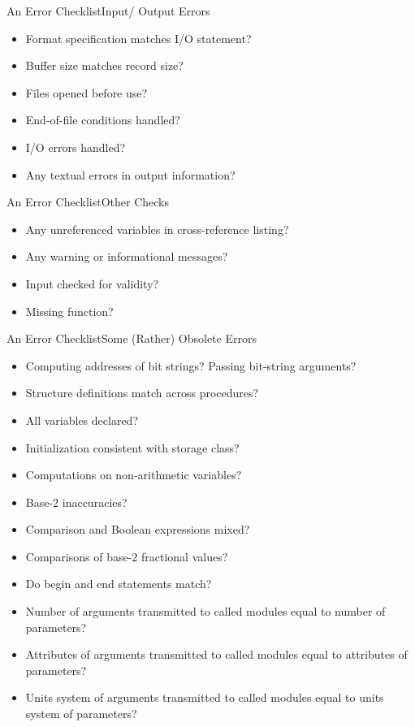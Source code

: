 \begin{Frame}{An Error Checklist}{Input/ Output Errors}
  \begin{itemize}
    \item Format specification matches I/O statement?
    \item Buffer size matches record size?
    \item Files opened before use?
    \item End-of-file conditions handled?
    \item I/O errors handled?
    \item Any textual errors in output information?
  \end{itemize}
\end{Frame}

\begin{Frame}{An Error Checklist}{Other Checks}
  \begin{itemize}
    \item Any unreferenced variables in cross-reference listing?
    \item Any warning or informational messages?
    \item Input checked for validity?
    \item Missing function?
  \end{itemize}
\end{Frame}

\begin{Frame}[allowframebreaks]{An Error Checklist}{Some (Rather) Obsolete Errors}
  \begin{itemize}
    \item Computing addresses of bit strings? Passing bit-string arguments?
    \item Structure definitions match across procedures?
    \item All variables declared?
    \item Initialization consistent with storage class?
    \item Computations on non-arithmetic variables?
    \item Base-2 inaccuracies?
    \item Comparison and Boolean expressions mixed?
  \end{itemize}
  
  \framebreak

  \begin{itemize}
    \item Comparisons of base-2 fractional values?
    \item Do begin and end statements match?
    \item Number of arguments transmitted to called modules equal to number of parameters?
    \item Attributes of arguments transmitted to called modules equal to attributes of parameters?
    \item Units system of arguments transmitted to called modules equal to units system of parameters?
  \end{itemize}
\end{Frame}

